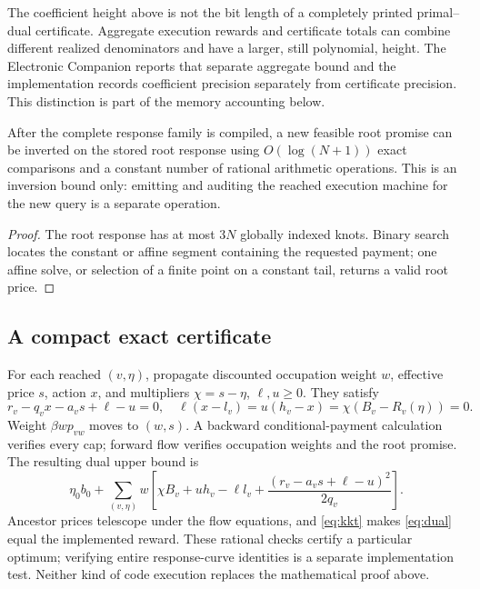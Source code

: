 The coefficient height above is not the bit length of a completely printed primal--dual certificate. Aggregate execution rewards and certificate totals can combine different realized denominators and have a larger, still polynomial, height. The Electronic Companion reports that separate aggregate bound and the implementation records coefficient precision separately from certificate precision. This distinction is part of the memory accounting below.

\begin{corollary}\label{cor:root-query}
After the complete response family is compiled, a new feasible root promise can be inverted on the stored root response using $O(\log(N+1))$ exact comparisons and a constant number of rational arithmetic operations. This is an inversion bound only: emitting and auditing the reached execution machine for the new query is a separate operation.
\end{corollary}
\begin{proof}
The root response has at most $3N$ globally indexed knots. Binary search locates the constant or affine segment containing the requested payment; one affine solve, or selection of a finite point on a constant tail, returns a valid root price.
\end{proof}

\subsection{A compact exact certificate}\label{sec:certificate}
For each reached $(v,\eta)$, propagate discounted occupation weight $w$, effective price $s$, action $x$, and multipliers $\chi=s-\eta$, $\ell,u\geq0$. They satisfy
\begin{equation}\label{eq:kkt}
 r_v-q_vx-a_vs+\ell-u=0,\quad
 \ell(x-l_v)=u(h_v-x)=\chi(B_v-R_v(\eta))=0.
\end{equation}
Weight $\beta wp_{vw}$ moves to $(w,s)$. A backward conditional-payment calculation verifies every cap; forward flow verifies occupation weights and the root promise. The resulting dual upper bound is
\begin{equation}\label{eq:dual}
 \eta_0b_0+\sum_{(v,\eta)}w\left[
 \chi B_v+u h_v-\ell l_v+
 \frac{(r_v-a_vs+\ell-u)^2}{2q_v}\right].
\end{equation}
Ancestor prices telescope under the flow equations, and \eqref{eq:kkt} makes \eqref{eq:dual} equal the implemented reward. These rational checks certify a particular optimum; verifying entire response-curve identities is a separate implementation test. Neither kind of code execution replaces the mathematical proof above.